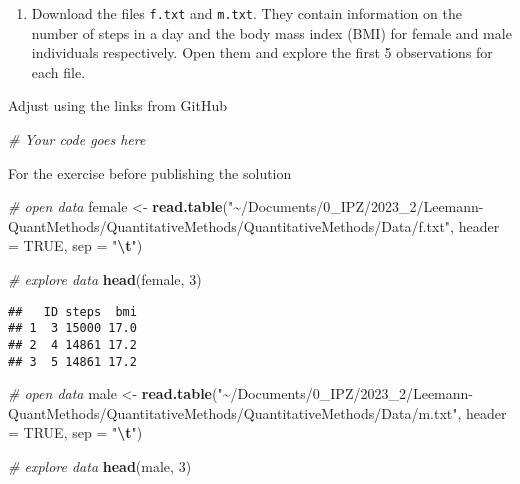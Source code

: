 \documentclass[
]{book}
\newenvironment{Shaded}{\begin{snugshade}}{\end{snugshade}}
\newcommand{\AttributeTok}[1]{\textcolor[rgb]{0.13,0.29,0.53}{#1}}
\newcommand{\CommentTok}[1]{\textcolor[rgb]{0.56,0.35,0.01}{\textit{#1}}}
\newcommand{\ConstantTok}[1]{\textcolor[rgb]{0.56,0.35,0.01}{#1}}
\newcommand{\DecValTok}[1]{\textcolor[rgb]{0.00,0.00,0.81}{#1}}
\newcommand{\FunctionTok}[1]{\textcolor[rgb]{0.13,0.29,0.53}{\textbf{#1}}}
\newcommand{\NormalTok}[1]{#1}
\newcommand{\OtherTok}[1]{\textcolor[rgb]{0.56,0.35,0.01}{#1}}
\newcommand{\SpecialCharTok}[1]{\textcolor[rgb]{0.81,0.36,0.00}{\textbf{#1}}}
\newcommand{\StringTok}[1]{\textcolor[rgb]{0.31,0.60,0.02}{#1}}
\providecommand{\tightlist}{%
  \setlength{\itemsep}{0pt}\setlength{\parskip}{0pt}}
\begin{document}
\begin{enumerate}
\def\labelenumi{\arabic{enumi}.}
\tightlist
\item
  Download the files \texttt{f.txt} and \texttt{m.txt}. They contain information on the number of steps in a day and the body mass index (BMI) for female and male individuals respectively. Open them and explore the first 5 observations for each file.
\end{enumerate}

{Adjust using the links from GitHub \href{}{}}

\begin{Shaded}
\begin{Highlighting}[]
\CommentTok{\# Your code goes here}
\end{Highlighting}
\end{Shaded}

{For the exercise before publishing the solution}

\begin{Shaded}
\begin{Highlighting}[]
\CommentTok{\# open data}
\NormalTok{female }\OtherTok{\textless{}{-}} \FunctionTok{read.table}\NormalTok{(}\StringTok{"\textasciitilde{}/Documents/0\_IPZ/2023\_2/Leemann{-}QuantMethods/QuantitativeMethods/QuantitativeMethods/Data/f.txt"}\NormalTok{, }\AttributeTok{header =} \ConstantTok{TRUE}\NormalTok{, }\AttributeTok{sep =} \StringTok{"}\SpecialCharTok{\textbackslash{}t}\StringTok{"}\NormalTok{)}

\CommentTok{\# explore data}
\FunctionTok{head}\NormalTok{(female, }\DecValTok{3}\NormalTok{)}
\end{Highlighting}
\end{Shaded}

\begin{verbatim}
##   ID steps  bmi
## 1  3 15000 17.0
## 2  4 14861 17.2
## 3  5 14861 17.2
\end{verbatim}

\begin{Shaded}
\begin{Highlighting}[]
\CommentTok{\# open data}
\NormalTok{male }\OtherTok{\textless{}{-}} \FunctionTok{read.table}\NormalTok{(}\StringTok{"\textasciitilde{}/Documents/0\_IPZ/2023\_2/Leemann{-}QuantMethods/QuantitativeMethods/QuantitativeMethods/Data/m.txt"}\NormalTok{, }\AttributeTok{header =} \ConstantTok{TRUE}\NormalTok{, }\AttributeTok{sep =} \StringTok{"}\SpecialCharTok{\textbackslash{}t}\StringTok{"}\NormalTok{)}

\CommentTok{\# explore data}
\FunctionTok{head}\NormalTok{(male, }\DecValTok{3}\NormalTok{)}
\end{Highlighting}
\end{Shaded}
\end{document}
